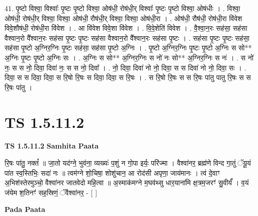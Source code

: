 \documentclass[17pt]{extarticle}
\begin{document}
41. पृ॒ष्टो विश्वा॒ विश्वाः᳚ पृ॒ष्टः पृ॒ष्टो विश्वा॒ ओष॑धी॒ रोष॑धी॒र् विश्वाः᳚ पृ॒ष्टः पृ॒ष्टो विश्वा॒ ओष॑धीः । . विश्वा॒ ओष॑धी॒ रोष॑धी॒र् विश्वा॒ विश्वा॒ ओष॑धी॒ रौष॑धी॒र् विश्वा॒ विश्वा॒ ओष॑धी॒रा । . ओष॑धी॒ रौष॑धी॒ रोष॑धी॒रा वि॑वेश विवे॒शौष॑धी॒ रोष॑धी॒रा वि॑वेश । . आ वि॑वेश विवे॒शा वि॑वेश । . वि॒वे॒शेति॑ विवेश । . वै॒श्वा॒न॒रः सह॑सा॒ सह॑सा वैश्वान॒रो वै᳚श्वान॒रः सह॑सा पृ॒ष्टः पृ॒ष्टः सह॑सा वैश्वान॒रो वै᳚श्वान॒रः सह॑सा पृ॒ष्टः । . सह॑सा पृ॒ष्टः पृ॒ष्टः सह॑सा॒ सह॑सा पृ॒ष्टो अ॒ग्निर॒ग्निः पृ॒ष्टः सह॑सा॒ सह॑सा पृ॒ष्टो अ॒ग्निः । . पृ॒ष्टो अ॒ग्निर॒ग्निः पृ॒ष्टः पृ॒ष्टो अ॒ग्निः स सो** अ॒ग्निः पृ॒ष्टः पृ॒ष्टो अ॒ग्निः सः । . अ॒ग्निः स सो** अ॒ग्निर॒ग्निः स नो॑ नः सो** अ॒ग्निर॒ग्निः स नः॑ । . स नो॑ नः॒ स स नो॒ दिवा॒ दिवा॑ नः॒ स स नो॒ दिवा᳚ । . नो॒ दिवा॒ दिवा॑ नो नो॒ दिवा॒ स स दिवा॑ नो नो॒ दिवा॒ सः । . दिवा॒ स स दिवा॒ दिवा॒ स रि॒षो रि॒षः स दिवा॒ दिवा॒ स रि॒षः । . स रि॒षो रि॒षः स स रि॒षः पा॑तु पातु रि॒षः स स रि॒षः पा॑तु । \newline
\pagebreak
{}

\section{ TS 1.5.11.2 }

\textbf{TS 1.5.11.2 } \newline
\textbf{Samhita Paata} \newline

रि॒षः पा॑तु॒ नक्तं᳚ ॥ जा॒तो यद॑ग्ने॒ भुव॑ना॒ व्यख्यः॑ प॒शुं न गो॒पा इर्यः॒ परि॑ज्मा । वैश्वा॑नर॒ ब्रह्म॑णे विन्द गा॒तुं ॅयू॒यं पा॑त स्व॒स्तिभिः॒ सदा॑ नः ॥ त्वम॑ग्ने शो॒चिषा॒ शोशु॑चान॒ आ रोद॑सी अपृणा॒ जाय॑मानः । त्वं दे॒वाꣳ अ॒भिश॑स्तेरमुञ्चो॒ वैश्वा॑नर जातवेदो महि॒त्वा ॥ अ॒स्माक॑मग्ने म॒घव॑थ्सु धार॒याना॑मि क्ष॒त्रम॒जरꣳ॑ सु॒वीर्यं᳚ । व॒यं ज॑येम श॒तिनꣳ॑ सह॒स्रिणं॒ ॅवैश्वा॑नर॒ - [ ] \newline

\textbf{Pada Paata} \newline
\end{document}
